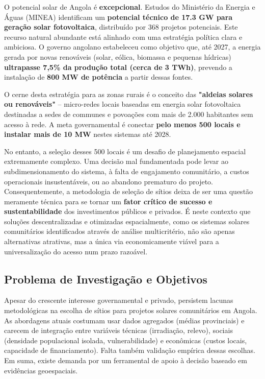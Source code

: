 \documentclass[12pt, a4paper]{article}
\begin{document}
\begin{itemize}
O potencial solar de Angola é \textbf{excepcional}. Estudos do Ministério da Energia e Águas (MINEA) identificam um \textbf{potencial técnico de 17.3 GW para geração solar fotovoltaica}, distribuído por 368 projetos potenciais. Este recurso natural abundante está alinhado com uma estratégia política clara e ambiciosa. O governo angolano estabeleceu como objetivo que, até 2027, a energia gerada por novas renováveis (solar, eólica, biomassa e pequenas hídricas) \textbf{ultrapasse 7,5\% da produção total (cerca de 3 TWh)}, prevendo a instalação de \textbf{800 MW de potência} a partir dessas fontes.

O cerne desta estratégia para as zonas rurais é o conceito das \textbf{"aldeias solares ou renováveis"} – micro-redes locais baseadas em energia solar fotovoltaica destinadas a sedes de communes e povoações com mais de 2.000 habitantes sem acesso à rede. A meta governamental é conectar \textbf{pelo menos 500 locais e instalar mais de 10 MW} nestes sistemas até 2028. 

No entanto, a seleção desses 500 locais é um desafio de planejamento espacial extremamente complexo. Uma decisão mal fundamentada pode levar ao subdimensionamento do sistema, à falta de engajamento comunitário, a custos operacionais insustentáveis, ou ao abandono prematuro do projeto. Consequentemente, a metodologia de seleção de sítios deixa de ser uma questão meramente técnica para se tornar um \textbf{fator crítico de sucesso e sustentabilidade} dos investimentos públicos e privados. É neste contexto que soluções descentralizadas e otimizadas espacialmente, como os sistemas solares comunitários identificados através de análise multicritério, não são apenas alternativas atrativas, mas a única via economicamente viável para a universalização do acesso num prazo razoável.

\subsection{Problema de Investigação e Objetivos}

Apesar do crescente interesse governamental e privado, persistem lacunas metodológicas na escolha de sítios para projetos solares comunitários em Angola. As abordagens atuais costumam usar dados agregados (médias provinciais) e carecem de integração entre variáveis técnicas (irradiação, relevo), sociais (densidade populacional isolada, vulnerabilidade) e econômicas (custos locais, capacidade de financiamento). Falta também validação empírica dessas escolhas. Em suma, existe demanda por um ferramental de apoio à decisão baseado em evidências geoespaciais.


\end{itemize}
\end{document}
